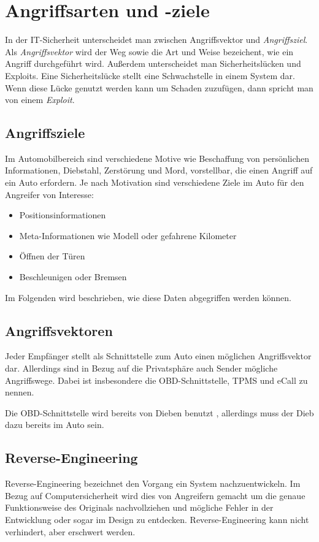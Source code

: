\section{Angriffsarten und -ziele}\label{sec:attack}

In der IT-Sicherheit unterscheidet man zwischen Angriffsvektor und
\textit{Angriffsziel}. Als \textit{Angriffsvektor} wird der Weg sowie die Art
und Weise bezeichent, wie ein Angriff durchgeführt wird\cite{Sambleben2012,Metasploit2012}.
Außerdem unterscheidet man Sicherheitslücken und Exploits. Eine
Sicherheitslücke stellt eine Schwachstelle in einem System dar. Wenn diese
Lücke genutzt werden kann um Schaden zuzufügen, dann spricht man von einem
\textit{Exploit}.


\subsection{Angriffsziele}
Im Automobilbereich sind verschiedene Motive wie Beschaffung von persönlichen
Informationen, Diebstahl, Zerstörung und Mord, vorstellbar, die einen Angriff
auf ein Auto erfordern. Je nach Motivation sind verschiedene Ziele im Auto für
den Angreifer von Interesse:

\begin{itemize}
    \item Positionsinformationen
    \item Meta-Informationen wie Modell oder gefahrene Kilometer
    \item Öffnen der Türen
    \item Beschleunigen oder Bremsen
\end{itemize}

Im Folgenden wird beschrieben, wie diese Daten abgegriffen werden können.


\subsection{Angriffsvektoren}
Jeder Empfänger stellt als Schnittstelle zum Auto einen möglichen
Angriffsvektor dar. Allerdings sind in Bezug auf die Privatsphäre auch Sender
mögliche Angriffswege. Dabei ist insbesondere die OBD-Schnittstelle, TPMS und
eCall zu nennen.

Die OBD-Schnittstelle wird bereits von Dieben benutzt \cite{Dailymail2015},
allerdings muss der Dieb dazu bereits im Auto sein.


\subsection{Reverse-Engineering}
Reverse-Engineering bezeichnet den Vorgang ein System nachzuentwickeln. Im
Bezug auf Computersicherheit wird dies von Angreifern gemacht um die genaue
Funktionsweise des Originals nachvollziehen und mögliche Fehler in der
Entwicklung oder sogar im Design zu entdecken. Reverse-Engineering kann nicht
verhindert, aber erschwert werden.

